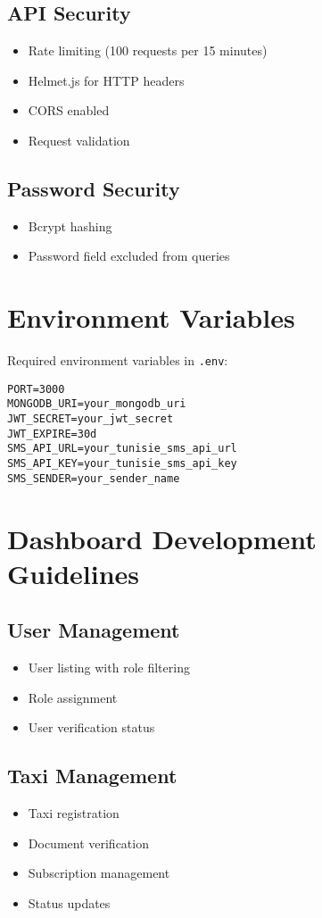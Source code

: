 \documentclass[11pt,a4paper]{article}
\begin{document}
\subsection{API Security}
\begin{itemize}
    \item Rate limiting (100 requests per 15 minutes)
    \item Helmet.js for HTTP headers
    \item CORS enabled
    \item Request validation
\end{itemize}

\subsection{Password Security}
\begin{itemize}
    \item Bcrypt hashing
    \item Password field excluded from queries
\end{itemize}

\section{Environment Variables}
Required environment variables in \texttt{.env}:
\begin{lstlisting}
PORT=3000
MONGODB_URI=your_mongodb_uri
JWT_SECRET=your_jwt_secret
JWT_EXPIRE=30d
SMS_API_URL=your_tunisie_sms_api_url
SMS_API_KEY=your_tunisie_sms_api_key
SMS_SENDER=your_sender_name
\end{lstlisting}

\section{Dashboard Development Guidelines}
\subsection{User Management}
\begin{itemize}
    \item User listing with role filtering
    \item Role assignment
    \item User verification status
\end{itemize}

\subsection{Taxi Management}
\begin{itemize}
    \item Taxi registration
    \item Document verification
    \item Subscription management
    \item Status updates
\end{itemize}
\end{document}
